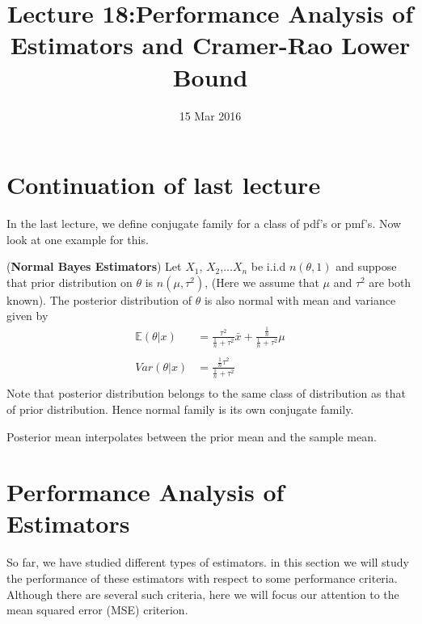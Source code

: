 \documentclass[a4paper,english,12pt]{article}
\title{Lecture 18:Performance Analysis of Estimators and Cramer-Rao Lower Bound}
\date{15 Mar 2016}
\author{}
\begin{document}
\author{}
\maketitle
\section*{Continuation of last lecture}
In the last lecture, we define conjugate family for a class of pdf's or pmf's. Now look at one example for this.
\begin{exmp}(\textbf{Normal Bayes Estimators})
Let $X_1$, $X_2$,...$X_n$ be i.i.d $n(\theta , 1)$ and suppose that prior distribution on $\theta$ is $n(\mu , \tau ^2)$, (Here we assume that $\mu$ and $\tau ^2$ are both known). The posterior distribution of $\theta$ is also normal with mean and variance given by 
\begin{align*}
\mathbb{E}(\theta | x) &= \frac{\tau ^2}{\frac{1}{n} + \tau ^2} \bar{x} + \frac{\frac{1}{n}}{\frac{1}{n} + \tau ^2} \mu \\\\
Var(\theta | x) &= \frac{\frac{1}{n} \tau ^2}{\frac{1}{n} + \tau ^2}\\
\end{align*}
Note that posterior distribution belongs to the same class of distribution as that of prior distribution. Hence normal family is its own conjugate family.
\end{exmp}
\begin{rem}
Posterior mean interpolates between the prior mean and the sample mean.
\end{rem} 
\section{Performance Analysis of Estimators}
So far, we have studied different types of estimators. in this section we will study the performance of these estimators with respect to some performance criteria. Although there are several such criteria, here we will focus our attention to the mean squared error (MSE) criterion.
\end{document}

